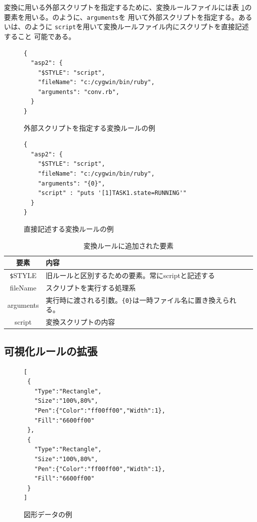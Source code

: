 変換に用いる外部スクリプトを指定するために、変換ルールファイルには表
\ref{conv}の要素を用いる。のように、\verb!arguments!を
用いて外部スクリプトを指定する。あるいは、のように
\verb!script!を用いて変換ルールファイル内にスクリプトを直接記述すること
可能である。

\begin{figure}
\begin{lstlisting}
{
  "asp2": {
    "$STYLE": "script",
    "fileName": "c:/cygwin/bin/ruby",
    "arguments": "conv.rb",
  }
}
\end{lstlisting} %
\caption{外部スクリプトを指定する変換ルールの例}\label{outside}
\end{figure}

\begin{figure}
\begin{lstlisting}
{
  "asp2": {
    "$STYLE": "script",
    "fileName": "c:/cygwin/bin/ruby",
    "arguments": "{0}",
    "script" : "puts '[1]TASK1.state=RUNNING'"
  }
}
\end{lstlisting} %
\caption{直接記述する変換ルールの例}
\label{inline}
\end{figure}

\begin{table}[hb]
\centering
\caption{変換ルールに追加された要素}\label{conv}
\begin{tabular}{|c|l|}
\hline
要素 & 内容  \\\hline
\verb!$!STYLE & 旧ルールと区別するための要素。常にscriptと記述する  \\
fileName  & スクリプトを実行する処理系 \\
arguments & 実行時に渡される引数。\verb!{0}!は一時ファイル名に置き換えられる。 \\
script    & 変換スクリプトの内容 \\
\hline
\end{tabular}
\end{table}

\subsection{可視化ルールの拡張}
\begin{figure}
\begin{lstlisting}
[
 {
   "Type":"Rectangle",
   "Size":"100%,80%",
   "Pen":{"Color":"ff00ff00","Width":1},
   "Fill":"6600ff00"
 },
 {
   "Type":"Rectangle",
   "Size":"100%,80%",
   "Pen":{"Color":"ff00ff00","Width":1},
   "Fill":"6600ff00"
 }
]
\end{lstlisting}
\label{array}
\caption{図形データの例}
\end{figure}

